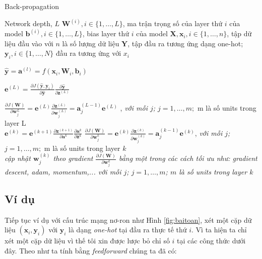 \begin{algorithm}[H]
\caption{Back-propagation}
\label{al:backward}
\begin{algorithmic}[1]
\REQUIRE Network depth, $L$
\REQUIRE $\textbf{W}^{(i)}, i \in \{1,\ldots,L \}$, ma trận trọng số của layer thứ $i$ của model
\REQUIRE $\textbf{b}^{(i)}, i \in \{1,\ldots,L \}$, bias layer thứ $i$ của model	
\REQUIRE $\textbf{X}, \textbf{x}_i, i \in \{1,\ldots,n \} $, tập dữ liệu đầu vào với $n$ là số lượng dữ liệu
\REQUIRE $\textbf{Y}$, tập đầu ra tương ứng dạng one-hot; $\textbf{y}_i, i\in \{1,\ldots,N\}$ đầu ra tương ứng với $x_i$

\STATE $\widehat{\textbf{y}} = \textbf{a}^{(l)}= f(\textbf{x}_{i},\textbf{W}_{i},\textbf{b}_{i})$

\STATE	$\textbf{e}^{(L)} = \frac{\partial J(\widehat{\textbf{y}},\textbf{y}_{i}) }{\partial \widehat{\textbf{y}}} \frac{\partial  \widehat{\textbf{y}}}{\partial \textbf{z}^{(L)}}$

\STATE $\frac{\partial J(\textbf{W})}{\partial \textbf{w}^{L}_j} = \textbf{e}^{(L)} \frac{\partial \textbf{z}^{(L)}}{\partial \textbf{w}^{(L)}_j} = \textbf{a}^{(L-1)}_{j}\textbf{e}^{(L)}$ , \textit{với mỗi $j$; $j =1,\ldots, m;$} m là số units trong layer L \\
		\STATE $\textbf{e}^{(k)}= \textbf{e}^{(k+1)} \frac{\partial  {\textbf{z}^{(k+1)}}}{\partial \textbf{a}^{k}} \frac{\partial\textbf{a}^{k}}{\partial\textbf{z}^{k}} $
		\STATE $\frac{\partial J(\textbf{W})}{\partial \textbf{w}^{k}_j}  =\textbf{e}^{(k)} \frac{\partial \textbf{z}^{(k)}}{\partial \textbf{w}^{(k)}_j} = \textbf{a}^{(k-1)}_{j}\textbf{e}^{(k)}$,  \textit{với mỗi $j$; $j =1,\ldots, m;$} m là số units trong layer $k$ \\
		
	\ENDFOR
	\STATE 	\textit{cập nhật $\textbf{w}^{(k)}_j$ theo gradient $\frac{\partial J(\textbf{W})}{\partial \textbf{w}^{k}_j} $ bằng một trong các cách tối ưu như: gradient descent, adam, momentum,... với mỗi $j$; $j =1,\ldots, m$; $m$ là số units trong layer $k$}
	
	\ENDFOR
\ENDFOR
\end{algorithmic}
\end{algorithm}


\subsection{Ví dụ}
Tiếp tục ví dụ với cấu trúc mạng nơ-ron như Hình \ref{fig:baitoan}, xét một cặp dữ liệu $(\textbf{x}_i,\textbf{y}_i)$ với $\textbf{y}_i$ là dạng \textit{one-hot} tại đầu ra thực tế thứ $i$. Vì ta hiện ta chỉ xét một cặp dữ liệu vì thế tôi xin được lược bỏ chỉ số $i$ tại các công thức dưới đây. Theo như ta tính bằng \textit{feedforward }chúng ta đã có: 


